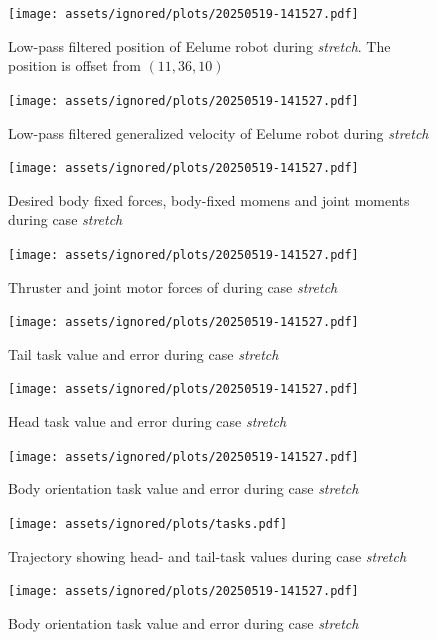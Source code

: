 \begin{figure}[!ht]
    \centering
    \texttt{[image: assets/ignored/plots/20250519-141527.pdf]}
    \caption[Low-pass filtered position of Eelume robot during \textit{stretch} case with \gls{tpc}]
    {Low-pass filtered position of Eelume robot during \textit{stretch}. The position is offset from \((11, 36, 10)\)}
    \label{fig:results:tpc:stretch:1:pos}
\end{figure}
\begin{figure}[!ht]
    \centering
    \texttt{[image: assets/ignored/plots/20250519-141527.pdf]}
    \caption{Low-pass filtered generalized velocity of Eelume robot during \textit{stretch}}
    \label{fig:results:tpc:stretch:1:vel}
\end{figure}
\begin{figure}[!ht]
    \centering
    \texttt{[image: assets/ignored/plots/20250519-141527.pdf]}
    \caption{Desired body fixed forces, body-fixed momens and joint moments during case \textit{stretch}}
    \label{fig:results:tpc:stretch:1:forces}
\end{figure}
\begin{figure}[!ht]
    \centering
    \texttt{[image: assets/ignored/plots/20250519-141527.pdf]}
    \caption{Thruster and joint motor forces of during case \textit{stretch}}
    \label{fig:results:tpc:stretch:1:forces-torques}
\end{figure}
\begin{figure}[!ht]
    \centering
    \texttt{[image: assets/ignored/plots/20250519-141527.pdf]}
    \caption{Tail task value and error during case \textit{stretch}}
    \label{fig:results:tpc:stretch:1:task:1}
\end{figure}
\begin{figure}[!ht]
    \centering
    \texttt{[image: assets/ignored/plots/20250519-141527.pdf]}
    \caption{Head task value and error during case \textit{stretch}}
    \label{fig:results:tpc:stretch:1:task:2}
\end{figure}
\begin{figure}[!ht]
    \centering
    \texttt{[image: assets/ignored/plots/20250519-141527.pdf]}
    \caption{Body orientation task value and error during case \textit{stretch}}
    \label{fig:results:tpc:stretch:1:task:3}
\end{figure}
\begin{figure}[!ht]
    \centering
    \texttt{[image: assets/ignored/plots/tasks.pdf]}
    \caption{Trajectory showing head- and tail-task values during case \textit{stretch}}
    \label{fig:results:tpc:stretch:task-traj}
\end{figure}
\begin{figure}[!ht]
    \centering
    \texttt{[image: assets/ignored/plots/20250519-141527.pdf]}
    \caption{Body orientation task value and error during case \textit{stretch}}
    \label{fig:results:tpc:stretch:dp-tracking}
\end{figure}



